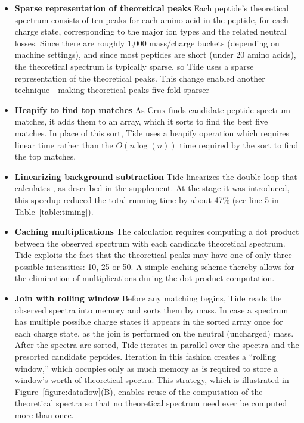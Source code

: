 \begin{itemize}

\item {\bf Sparse representation of theoretical peaks} Each peptide's
  theoretical spectrum consists of ten peaks for each amino acid in
  the peptide, for each charge state, corresponding to the major ion
  types and the related neutral losses. Since there are roughly 1,000
  mass/charge buckets (depending on machine settings), and since most
  peptides are short (under 20 amino acids), the theoretical spectrum
  is typically sparse, so Tide uses a sparse representation of the
  theoretical peaks. This change enabled another technique---making
  theoretical peaks five-fold sparser\DIFaddbegin {}\DIFaddend 

\item {\bf Heapify to find top matches} As Crux finds candidate
  peptide-spectrum matches, it adds them to an array, which it sorts
  to find the best five matches. In place of this sort, Tide uses a
  heapify operation which requires linear time rather than the $O(n
  \log(n))$ time required by the sort to find the top matches.

\item {\bf Linearizing background subtraction} Tide linearizes the
  double loop that calculates \XCorr, as described in the supplement.
  At the stage it was introduced, this speedup reduced the total
  running time by about 47\% (see line 5 in Table~\ref{table:timing}).

\item {\bf Caching multiplications} The \XCorr calculation requires
  computing a dot product between the observed spectrum with each
  candidate theoretical spectrum.  Tide exploits the fact that the
  theoretical peaks may have one of only three possible intensities:
  10, 25 or 50.  A simple caching scheme thereby allows for the
  elimination of multiplications during the dot product computation.

\item {\bf Join with rolling window} Before any matching begins, Tide
  reads the observed spectra into memory and sorts them by mass.  In
  case a spectrum has multiple possible charge states it appears in
  the sorted array once for each charge state, as the join is
  performed on the neutral (uncharged) mass.  After the spectra are
  sorted, Tide iterates in parallel over the spectra and the
  presorted candidate peptides.  Iteration in this fashion creates a
  ``rolling window,'' which occupies only as much memory as is
  required to store a window's worth of theoretical spectra. This
  strategy, which is illustrated in Figure~\ref{figure:dataflow}(B),
  enables reuse of the computation of the theoretical spectra so that
  no theoretical spectrum need ever be computed more than once.


\end{itemize}
